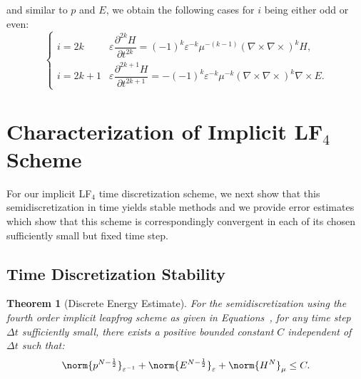\documentclass{amsart}
\theoremstyle{thmstyleone}%
\newtheorem{theorem}{Theorem}%
\theoremstyle{thmstyletwo}%
\theoremstyle{thmstylethree}%
\begin{document}
and similar to $p$ and $E$, we obtain the following cases for $i$ being either odd or even:
\begin{equation}
 \begin{cases}
i = 2k & \varepsilon \dfrac{\partial^{2k} H}{\partial t^{2k}} = (-1)^k  \varepsilon^{-k} \mu^{-(k-1)} \left(\nabla \times \nabla \times\right)^k H, \\
i = 2k+1 & \varepsilon \dfrac{\partial^{2k+1} H}{\partial t^{2k+1}} = -(-1)^k \varepsilon^{-k} \mu^{-k} (\nabla \times \nabla \times)^k  \nabla \times E.
\end{cases} \label{eqn:H_derivative}
\end{equation}


\section{Characterization of Implicit LF$_4$ Scheme} \label{sec:implicit_lf4}

For our implicit LF$_4$ time discretization scheme, we next show that this semidiscretization in time yields stable methods and we provide error estimates which show that this scheme is correspondingly convergent in each of its chosen sufficiently small but fixed time step.

\subsection{Time Discretization Stability}

\begin{theorem}[Discrete Energy Estimate] \label{thm:dscrt_enrgy_estmt_lf4}
  For the semidiscretization using the fourth order implicit leapfrog scheme as given in Equations~, for any time step $\Delta t$ sufficiently small, there exists a positive bounded constant $C$ independent of $\Delta t$ such that:
\[
  \norm{p^{N - \frac{1}{2}}}_{\varepsilon^{-1}} + \norm{E^{N - \frac{1}{2}}}_{\varepsilon} + \norm{H^N}_{\mu} \le C.
\]
\end{theorem}
\end{document}
